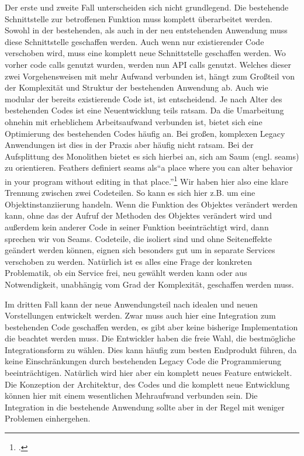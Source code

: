 Der erste und zweite Fall unterscheiden sich nicht grundlegend. Die bestehende Schnittstelle zur betroffenen Funktion muss komplett überarbeitet werden. Sowohl in der bestehenden, als auch in der neu entstehenden Anwendung muss diese Schnittstelle geschaffen werden. Auch wenn nur existierender Code verschoben wird, muss eine komplett neue Schnittstelle geschaffen werden. Wo vorher code calls genutzt wurden, werden nun API calls genutzt.
Welches dieser zwei Vorgehensweisen mit mehr Aufwand verbunden ist, hängt zum Großteil von der Komplexität und Struktur der bestehenden Anwendung ab. Auch wie modular der bereits existierende Code ist, ist entscheidend. Je nach Alter des bestehenden Codes ist eine Neuentwicklung teils ratsam. Da die Umarbeitung ohnehin mit erheblichem Arbeitsaufwand verbunden ist, bietet sich eine Optimierung des bestehenden Codes häufig an. Bei großen, komplexen Legacy Anwendungen ist dies in der Praxis aber häufig nicht ratsam.
Bei der Aufsplittung des Monolithen bietet es sich hierbei an, sich am Saum (engl. seams) zu orientieren. Feathers definiert seams als``a place where you can alter behavior in your program without editing in that place.''\footcite[][Seite 29]{feathers2004working} Wir haben hier also eine klare Trennung zwischen zwei Codeteilen. So kann es sich hier z.B. um eine Objektinstanziierung handeln. Wenn die Funktion des Objektes verändert werden kann, ohne das der Aufruf der Methoden des Objektes verändert wird und außerdem kein anderer Code in seiner Funktion beeinträchtigt wird, dann sprechen wir von Seams. Codeteile, die isoliert sind und ohne Seiteneffekte geändert werden können, eignen sich besonders gut um in separate Services verschoben zu werden. Natürlich ist es alles eine Frage der konkreten Problematik, ob ein Service frei, neu gewählt werden kann oder aus Notwendigkeit, unabhängig vom Grad der Komplexität, geschaffen werden muss.

Im dritten Fall kann der neue Anwendungsteil nach idealen und neuen Vorstellungen entwickelt werden. Zwar muss auch hier eine Integration zum bestehenden Code geschaffen werden, es gibt aber keine bisherige Implementation die beachtet werden muss. Die Entwickler haben die freie Wahl, die bestmögliche Integrationsform zu wählen. Dies kann häufig zum besten Endprodukt führen, da keine Einschränkungen durch bestehenden Legacy Code die Programmierung beeinträchtigen. Natürlich wird hier aber ein komplett neues Feature entwickelt. Die Konzeption der Architektur, des Codes und die komplett neue Entwicklung können hier mit einem wesentlichen Mehraufwand verbunden sein. Die Integration in die bestehende Anwendung sollte aber in der Regel mit weniger Problemen einhergehen.

